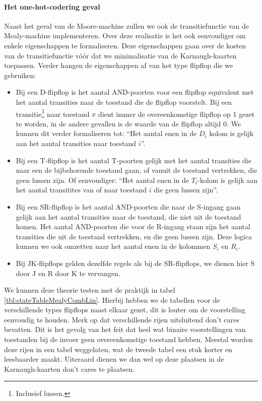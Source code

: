 \paragraph{Het one-hot-codering geval}Naast het geval van de Moore-machine zullen we ook de transitiefunctie van de Mealy-machine implementeren. Over deze realisatie is het ook eenvoudiger om enkele eigenschappen te formaliseren. Deze eigenschappen gaan over de kosten van de transitiefunctie v\'o\'or dat we minimalisatie van de Karnaugh-kaarten toepassen. Verder hangen de eigenschappen af van het type flipflop die we gebruiken:
\begin{itemize}
 \item Bij een D-flipflop is het aantal AND-poorten voor een flipflop equivalent met het aantal transities naar de toestand die de flipflop voorstelt. Bij een transitie\footnote{Inclusief lussen.} naar toestand $x$ dient immer de overeenkomstige flipflop op 1 gezet te worden, in de andere gevallen is de waarde van de flipflop altijd 0. We kunnen dit verder formaliseren tot: ``Het aantal enen in de $D_i$ kolom is gelijk aan het aantal transities naar toestand $i$''.
 \item Bij een T-flipflop is het aantal T-poorten gelijk met het aantal transities die naar een de bijbehorende toestand gaan, of vanuit de toestand vertrekken, die geen lussen zijn. Of eenvoudiger: ``Het aantal enen in de $T_i$-kolom is gelijk aan het aantal transitites van of naar toestand $i$ die geen lussen zijn''.
 \item Bij een SR-flipflop is het aantal AND-poorten die naar de S-ingang gaan gelijk aan het aantal transities naar de toestand, die niet uit de toestand komen. Het aantal AND-poorten die voor de R-ingang staan zijn het aantal transities die uit de toestand vertrekken, en die geen lussen zijn. Deze logica kunnen we ook omzetten naar het aantal enen in de kolommen $S_i$ en $R_i$.
 \item Bij JK-flipflops gelden dezelfde regels als bij de SR-flipflops, we dienen hier S door J en R door K te vervangen.
\end{itemize}
We kunnen deze theorie testen met de praktijk in tabel \ref{tbl:stateTableMealyCombLin}. Hierbij hebben we de tabellen voor de verschillende types flipflops naast elkaar gezet, dit is louter om de voorstelling eenvoudig te houden. Merk op dat verschillende rijen uitsluitend don't cares bevatten. Dit is het gevolg van het feit dat heel wat binaire voorstellingen van toestanden bij de invoer geen overeenkomstige toestand hebben. Meestal worden deze rijen in een tabel weggelaten, wat de tweede tabel een stuk korter en leesbaarder maakt. Uiteraard dienen we dan wel op deze plaatsen in de Karnaugh-kaarten don't cares te plaatsen.
